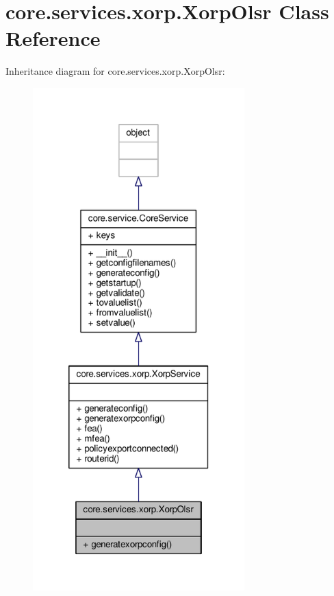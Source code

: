 \hypertarget{classcore_1_1services_1_1xorp_1_1_xorp_olsr}{\section{core.\+services.\+xorp.\+Xorp\+Olsr Class Reference}
\label{classcore_1_1services_1_1xorp_1_1_xorp_olsr}
}


Inheritance diagram for core.\+services.\+xorp.\+Xorp\+Olsr\+:
\nopagebreak
\begin{figure}[H]
\begin{center}
\leavevmode
\includegraphics[height=550pt]{classcore_1_1services_1_1xorp_1_1_xorp_olsr__inherit__graph}
\end{center}
\end{figure}


